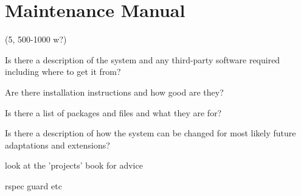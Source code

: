 \clearpage
\section{Maintenance Manual}
\label{sec:maintenance_manual}


(5, 500-1000 w?)

Is there a description of the system and any third-party software required
including where to get it from?

Are there installation instructions and how good are they?

Is there a list of packages and files and what they are for?

Is there a description of how the system can be changed for most likely future
adaptations and extensions?

look at the 'projects' book for advice




 rspec guard etc

